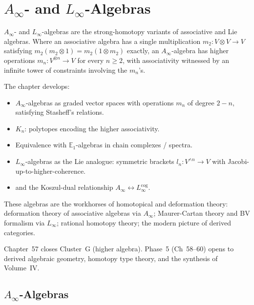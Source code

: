
\chapter{$A_\infty$- and $L_\infty$-Algebras}

\begin{overviewbox}
$A_\infty$- and $L_\infty$-algebras are the strong-homotopy variants of
associative and Lie algebras. Where an associative algebra has a single
multiplication $m_2 : V \otimes V \to V$ satisfying $m_2(m_2 \otimes 1) =
m_2(1 \otimes m_2)$ exactly, an $A_\infty$-algebra has higher operations
$m_n : V^{\otimes n} \to V$ for every $n \geq 2$, with associativity
witnessed by an infinite tower of constraints involving the $m_n$'s.

The chapter develops:
\begin{itemize}
  \item $A_\infty$-algebras as graded vector spaces with operations
        $m_n$ of degree $2-n$, satisfying Stasheff's relations.
  \item {} $K_n$: polytopes encoding the
        higher associativity.
  \item Equivalence with $\mathbb{E}_1$-algebras in chain complexes /
        spectra.
  \item $L_\infty$-algebras as the Lie analogue: symmetric brackets
        $l_n : V^{\wedge n} \to V$ with Jacobi-up-to-higher-coherence.
  \item {} and the Koszul-dual relationship
        $A_\infty \leftrightarrow L_\infty^{\mathrm{cog}}$.
\end{itemize}

These algebras are the workhorses of homotopical and deformation theory:
deformation theory of associative algebras via $A_\infty$; Maurer-Cartan
theory and BV formalism via $L_\infty$; rational homotopy theory; the
modern picture of derived categories.

Chapter~57 closes Cluster~G (higher algebra). Phase~5 (Ch~58--60) opens
to derived algebraic geometry, homotopy type theory, and the synthesis
of Volume~IV.
\end{overviewbox}


\section{$A_\infty$-Algebras}
\label{sec:Ainf}

